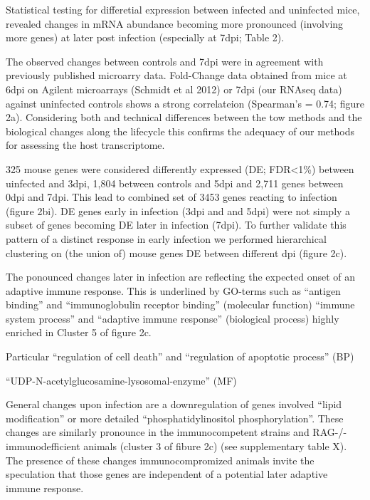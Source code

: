 \documentclass{bmcart}
\begin{document}
Statistical testing for differetial expression between infected and
uninfected mice, revealed changes in mRNA abundance becoming more
pronounced (involving more genes) at later post infection (especially
at 7dpi; Table 2).

The observed changes between controls and 7dpi were in agreement with
previously published microarry data. Fold-Change data obtained from
mice at 6dpi on Agilent microarrays (Schmidt et al 2012) or 7dpi (our
RNAseq data) against uninfected controls shows a strong correlateion
(Spearman's \rho = 0.74; figure 2a). Considering both and technical
differences between the tow methods and the biological changes along
the lifecycle this confirms the adequacy of our methods for assessing
the host transcriptome.

325 mouse genes were considered differently expressed (DE; FDR<1\%)
between uinfected and 3dpi, 1,804 between controls and 5dpi and 2,711
genes between 0dpi and 7dpi. This lead to combined set of 3453 genes
reacting to infection (figure 2bi).  DE genes early in infection (3dpi
and and 5dpi) were not simply a subset of genes becoming DE later in
infection (7dpi). To further validate this pattern of a distinct
response in early infection we performed hierarchical clustering on
(the union of) mouse genes DE between different dpi (figure 2c).


The ponounced changes later in infection are reflecting the expected
onset of an adaptive immune response. This is underlined by GO-terms
such as ``antigen binding'' and ``immunoglobulin receptor binding''
(molecular function) ``immune system process'' and ``adaptive immune
response'' (biological process) highly enriched in Cluster 5 of figure
2c.

Particular ``regulation of cell death'' and ``regulation of apoptotic
process'' (BP)

``UDP-N-acetylglucosamine-lysosomal-enzyme'' (MF)



General changes upon infection are a downregulation of genes involved
``lipid modification'' or more detailed ``phosphatidylinositol
phosphorylation''. These changes are similarly pronounce in the
immunocompetent strains and RAG-/- immunodefficient animals (cluster 3
of fibure 2c) (see supplementary table X).  The presence of these
changes immunocompromized animals invite the speculation that those
genes are independent of a potential later adaptive immune response.
\end{document}
